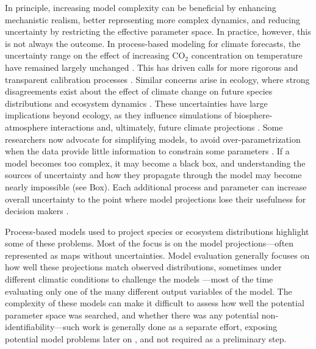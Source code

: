 \documentclass[11pt]{article}
\newcommand{\llabel}[1]{\hypertarget{lintarget:#1}{}\linelabel{lin:#1}}
\begin{document}
In principle, increasing model complexity can be beneficial by enhancing mechanistic realism, better representing more complex dynamics, and \llabel{quant2}reducing uncertainty by restricting the effective parameter space. In practice, however, this is not always the outcome. In process-based modeling for climate forecasts, the uncertainty range on the effect of increasing CO$_{2}$ concentration on temperature have remained largely unchanged \citep{Zelinka2020}. This has driven calls for more rigorous and transparent calibration processes \citep{balaji2022general}. Similar concerns arise in ecology, where strong disagreements exist about the effect of climate change on future species distributions \citep{Cheaib2012} and ecosystem dynamics \citep{Lovenduski2017}.
These uncertainties have large implications beyond ecology, as they influence simulations of biosphere-atmosphere interactions and, ultimately, future climate projections \citep{Bonan2018, simpson2025confronting}.
Some researchers now advocate for simplifying models, to avoid over-parametrization when the data provide little information to constrain some parameters \citep{Wang2017, Harrison2021}. 
If a model becomes too complex, it may become a black box,
and understanding the sources of uncertainty and how they propagate through the model may become nearly impossible (see Box).
Each additional process and parameter can increase overall uncertainty to the point where model projections lose their usefulness for decision makers \citep{Saltelli2020}. 

Process-based models used to project species or ecosystem distributions highlight some of these problems. Most of the focus is on the model projections---often represented as maps without uncertainties. Model evaluation generally focuses on how well these projections match observed distributions, sometimes under different climatic conditions to challenge the models \citep{VanderMeersch2025a}---most of the time evaluating only one of the many different output variables of the model.
The complexity of these models can make it difficult to assess how well the potential parameter space was searched, and whether there was any potential non-identifiability---such work is generally done as a separate effort, exposing potential model problems later on \citep{VanderMeersch2025b}, and not required as a preliminary step. 
\end{document}
